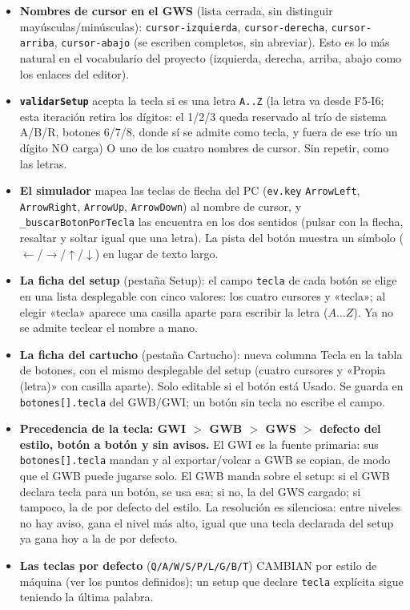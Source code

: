 \begin{itemize}
	\item \textbf{Nombres de cursor en el GWS} (lista cerrada, sin distinguir mayúsculas/minúsculas): \texttt{cursor-izquierda}, \texttt{cursor-derecha}, \texttt{cursor-arriba}, \texttt{cursor-abajo} (se escriben completos, sin abreviar). Esto es lo más natural en el vocabulario del proyecto (izquierda, derecha, arriba, abajo como los enlaces del editor).
	
	\item \textbf{\texttt{validarSetup}} acepta la tecla si es una letra \texttt{A..Z} (la letra va desde F5-I6; esta iteración retira los dígitos: el 1/2/3 queda reservado al trío de sistema A/B/R, botones 6/7/8, donde sí se admite como tecla, y fuera de ese trío un dígito NO carga) O uno de los cuatro nombres de cursor. Sin repetir, como las letras.
	
	\item \textbf{El simulador} mapea las teclas de flecha del PC (\texttt{ev.key} \texttt{ArrowLeft}, \texttt{ArrowRight}, \texttt{ArrowUp}, \texttt{ArrowDown}) al nombre de cursor, y \texttt{\_buscarBotonPorTecla} las encuentra en los dos sentidos (pulsar con la flecha, resaltar y soltar igual que una letra). La pista del botón muestra un símbolo ($\leftarrow$/$\rightarrow$/$\uparrow$/$\downarrow$) en lugar de texto largo.
	\item \textbf{La ficha del setup} (pestaña Setup): el campo \texttt{tecla} de cada botón se elige en una lista desplegable con cinco valores: los cuatro cursores y «tecla»; al elegir «tecla» aparece una casilla aparte para escribir la letra ($A \dots Z$). Ya no se admite teclear el nombre a mano.
	
	\item \textbf{La ficha del cartucho} (pestaña Cartucho): nueva columna Tecla en la tabla de botones, con el mismo desplegable del setup (cuatro cursores y «Propia (letra)» con casilla aparte). Solo editable si el botón está Usado. Se guarda en \texttt{botones[].tecla} del GWB/GWI; un botón sin tecla no escribe el campo.
	
	\item \textbf{Precedencia de la tecla: GWI $>$ GWB $>$ GWS $>$ defecto del estilo, botón a botón y sin avisos.} El GWI es la fuente primaria: sus \texttt{botones[].tecla} mandan y al exportar/volcar a GWB se copian, de modo que el GWB puede jugarse solo. El GWB manda sobre el setup: si el GWB declara tecla para un botón, se usa esa; si no, la del GWS cargado; si tampoco, la de por defecto del estilo. La resolución es silenciosa: entre niveles no hay aviso, gana el nivel más alto, igual que una tecla declarada del setup ya gana hoy a la de por defecto.
	
	\item \textbf{Las teclas por defecto} (\texttt{Q/A/W/S/P/L/G/B/T}) CAMBIAN por estilo de máquina (ver los puntos definidos); un setup que declare \texttt{tecla} explícita sigue teniendo la última palabra.
\end{itemize}

